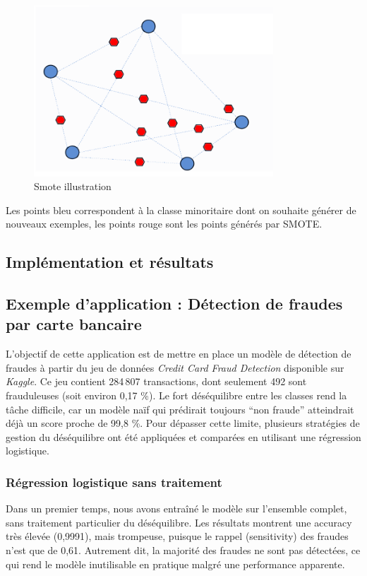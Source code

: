 \documentclass{article}
\begin{document}
\begin{figure}[h!]
    \centering
    \includegraphics[width=0.8\textwidth]{images/smote.png}
    \caption{Smote illustration}
    \label{fig:example}
\end{figure}
Les points bleu correspondent à la classe minoritaire dont on souhaite générer de nouveaux exemples, les points rouge sont les points générés par SMOTE.

\newpage

\subsection{Implémentation et résultats}
\subsection*{Exemple d'application : Détection de fraudes par carte bancaire}

L’objectif de cette application est de mettre en place un modèle de détection de fraudes à partir du jeu de données \textit{Credit Card Fraud Detection} disponible sur \textit{Kaggle}.
Ce jeu contient 284\,807 transactions, dont seulement 492 sont frauduleuses (soit environ 0,17 \%).
Le fort déséquilibre entre les classes rend la tâche difficile, car un modèle naïf qui prédirait toujours ``non fraude'' atteindrait déjà un score proche de 99,8 \%.
Pour dépasser cette limite, plusieurs stratégies de gestion du déséquilibre ont été appliquées et comparées en utilisant une régression logistique.

\subsubsection*{Régression logistique sans traitement}
Dans un premier temps, nous avons entraîné le modèle sur l’ensemble complet, sans traitement particulier du déséquilibre.
Les résultats montrent une accuracy très élevée (0,9991), mais trompeuse, puisque le rappel (sensitivity) des fraudes n’est que de 0,61.
Autrement dit, la majorité des fraudes ne sont pas détectées, ce qui rend le modèle inutilisable en pratique malgré une performance apparente.
\end{document}
